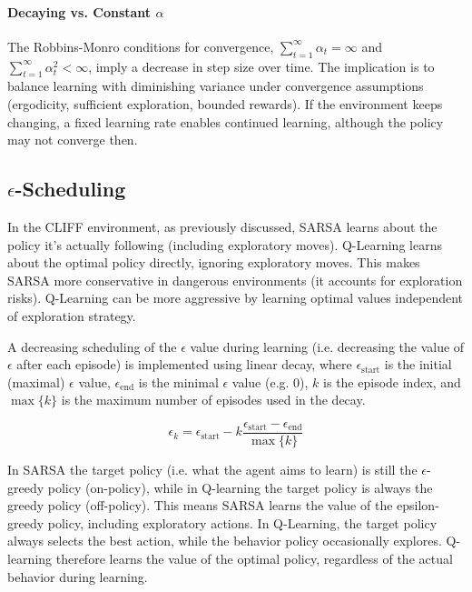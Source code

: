\documentclass[12pt]{article}
\begin{document}
\paragraph{Decaying vs. Constant \(\alpha\)}

The Robbins-Monro conditions for convergence,
$\sum_{t=1}^\infty \alpha_t = \infty$ and $\sum_{t=1}^\infty \alpha_t^2 < \infty$,
imply a decrease in step size over time.
The implication is to balance learning with diminishing variance
under convergence assumptions (ergodicity, sufficient exploration, bounded rewards).
If the environment keeps changing, a fixed learning rate enables continued learning,
although the policy may not converge then.


\subsection{\texorpdfstring{$\epsilon$}{e}-Scheduling}

In the CLIFF environment, as previously discussed,
SARSA learns about the policy it's actually following (including exploratory moves).
Q-Learning learns about the optimal policy directly, ignoring exploratory moves.
This makes SARSA more conservative in dangerous environments (it accounts for exploration risks).
Q-Learning can be more aggressive by learning optimal values independent of exploration strategy.

A decreasing scheduling of the $\epsilon$ value during learning
(i.e. decreasing the value of $\epsilon$ after each episode) is implemented using
linear decay,
where $\epsilon_\text{start}$ is the initial (maximal) $\epsilon$ value,
$\epsilon_\text{end}$ is the minimal $\epsilon$ value (e.g. $0$),
$k$ is the episode index, and
$\max\{k\}$ is the maximum number of episodes used in the decay.

\begin{equation}
	\epsilon_k = \epsilon_\text{start} - k \frac{\epsilon_\text{start} - \epsilon_\text{end}}{\max\{k\}}
\end{equation}


In SARSA the target policy (i.e. what the agent aims to learn)
is still the $\epsilon$-greedy policy (on-policy), while
in Q-learning the target policy is always the greedy policy (off-policy).
This means SARSA learns the value of the epsilon-greedy policy, including exploratory actions.
In Q-Learning, the target policy always selects the best action, while the behavior policy occasionally explores.
Q-learning therefore learns the value of the optimal policy, regardless of the actual behavior during learning.
\end{document}
